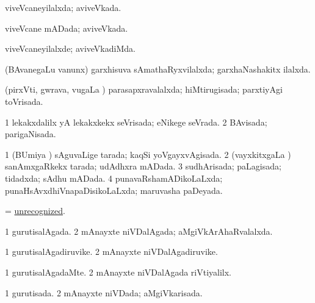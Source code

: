 \bentry
{} 
\gl{\gu}
\expl{}
\bmng
viveVcaneyilalxda; aviveVkada. 
\emng
\eentry

\bentry
{} 
\gl{\gu}
\expl{}
\bmng
viveVcane mADada; aviveVkada. 
\emng
\eentry

\bentry
{} 
\gl{\kirxvi}
\expl{}
\bmng
viveVcaneyilalxde; aviveVkadiMda. 
\emng
\eentry

\bentry
{} 
\gl{\gu}
\expl{}
\bmng
(BAvanegaLu \mo vanunx) garxhisuva sAmathaRyxvilalxda; garxhaNashakitx ilalxda. 
\emng
\eentry

\bentry
{} 
\gl{\gu}
\expl{}
\bmng
(pirxVti, gwrava, \mo vugaLa \vi) parasapxravalalxda; hiMtirugisada; parxtiyAgi toVrisada. 
\emng
\eentry

\bentry
{} 
\gl{\gu}
\expl{}
\bmng
\bnum
\num{1} lekakxdalilx yA lekakxkekx seVrisada; eNikege seVrada. 
\num{2} BAvisada; parigaNisada. 
\enum
\emng
\eentry

\bentry
{} 
\gl{\gu}
\expl{}
\bmng
\bnum
\num{1} (BUmiya \vi) sAguvaLige tarada; kaqSi yoVgayxvAgisada. 
\num{2} (vayxkitxgaLa \vi) sanAmxgaRkekx tarada; udAdhxra mADada. 
\num{3} sudhArisada; paLagisada; tidadxda; sAdhu mADada. 
\num{4} punavaRshamADikoLaLxda; punaHsAvxdhiVnapaDisikoLaLxda; maruvasha paDeyada. 
\enum
\emng
\eentry

\bentry
{} 
\gl{\gu}
\expl{}
\bmng
= \hyperlink{unrecognized}{unrecognized}. 
\emng
\eentry

\bentry 
{} 
\gl{\gu}
\expl{}
\bmng
\bnum
\num{1} gurutisalAgada. 
\num{2} mAnayxte niVDalAgada; aMgiVkArAhaRvalalxda. 
\enum
\emng
\eentry

\bentry
{} 
\gl{\nA}
\expl{}
\bmng
\bnum
\num{1} gurutisalAgadiruvike. 
\num{2} mAnayxte niVDalAgadiruvike. 
\enum
\emng
\eentry

\bentry
{} 
\gl{\kirxvi}
\expl{}
\bmng
\bnum
\num{1} gurutisalAgadaMte. 
\num{2} mAnayxte niVDalAgada riVtiyalilx. 
\enum
\emng
\eentry

\bentry
{} 
\gl{\gu}
\expl{}
\bmng
\bnum
\num{1} gurutisada. 
\num{2} mAnayxte niVDada; aMgiVkarisada. 
\enum
\emng
\eentry


